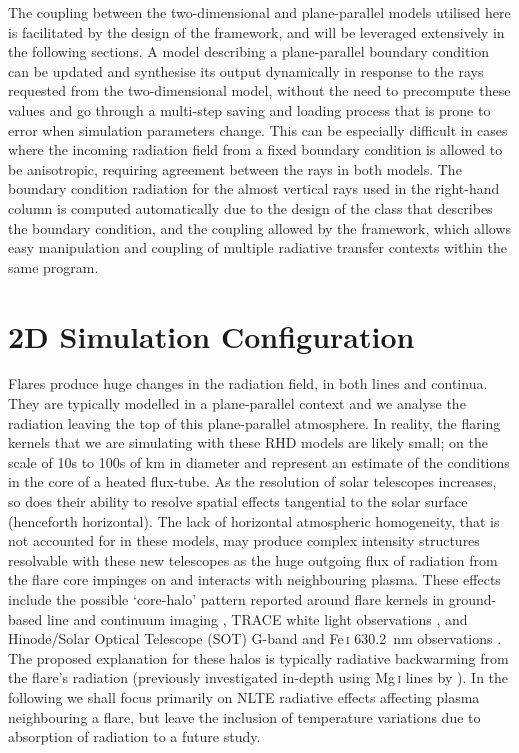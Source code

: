 The coupling between the two-dimensional and plane-parallel models utilised here is facilitated by the design of the \Lw{} framework, and will be leveraged extensively in the following sections.
A \Lw{} model describing a plane-parallel boundary condition can be updated and synthesise its output dynamically in response to the rays requested from the two-dimensional model, without the need to precompute these values and go through a multi-step saving and loading process that is prone to error when simulation parameters change.
This can be especially difficult in cases where the incoming radiation field from a fixed boundary condition is allowed to be anisotropic, requiring agreement between the rays in both models.
The boundary condition radiation for the almost vertical rays used in the right-hand column is computed automatically due to the design of the class that describes the boundary condition, and the coupling allowed by the framework, which allows easy manipulation and coupling of multiple radiative transfer contexts within the same program.

\section{2D Simulation Configuration}

Flares produce huge changes in the radiation field, in both lines and continua.
They are typically modelled in a plane-parallel context and we analyse the radiation leaving the top of this plane-parallel atmosphere.
In reality, the flaring kernels that we are simulating with these RHD models are likely small; on the scale of 10s to 100s of \si{\kilo\metre} in diameter \citep{Jing2016} and represent an estimate of the conditions in the core of a heated flux-tube.
As the resolution of solar telescopes increases, so does their ability to resolve spatial effects tangential to the solar surface (henceforth horizontal).
The lack of horizontal atmospheric homogeneity, that is not accounted for in these models, may produce complex intensity structures resolvable with these new telescopes as the huge outgoing flux of radiation from the flare core impinges on and interacts with neighbouring plasma.
These effects include the possible `core-halo' pattern reported around flare kernels in ground-based line and continuum imaging \citep{Neidig1993,Xu2006}, TRACE white light observations \citep{Hudson2006}, and Hinode/Solar Optical Telescope (SOT) G-band and Fe\,\textsc{i} \SI{630.2}{\nano\m} observations \citep{Isobe2007}.
The proposed explanation for these halos is typically radiative backwarming from the flare's radiation (previously investigated in-depth using Mg\,\textsc{i} lines by \citet{Metcalf1990}).
In the following we shall focus primarily on NLTE radiative effects affecting plasma neighbouring a flare, but leave the inclusion of temperature variations due to absorption of radiation to a future study.

